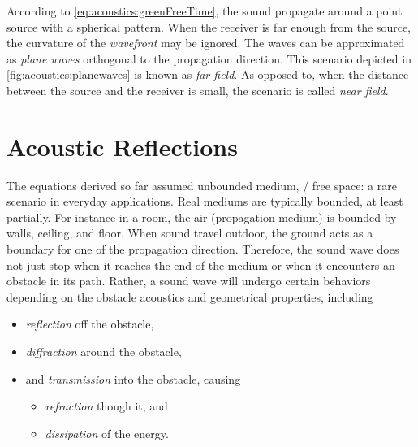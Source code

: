 According to \cref{eq:acoustics:greenFreeTime}, the sound propagate around a point source with a spherical pattern.
When the receiver is far enough from the source, the curvature of the \textit{wavefront} may be ignored.
The waves can be approximated as \textit{plane waves} orthogonal to the propagation direction.
This scenario depicted in \cref{fig:acoustics:planewaves} is known as \textit{far-field}.
As opposed to, when the distance between the source and the receiver is small, the scenario is called \textit{near field}.

\section{Acoustic Reflections}\label{ch:acoustics:sec:reflection}
The equations derived so far assumed unbounded medium, \ie/ free space: a rare scenario in everyday applications.
Real mediums are typically bounded, at least partially.
For instance in a room, the air (propagation medium) is bounded by walls, ceiling, and floor.
When sound travel outdoor, the ground acts as a boundary for one of the propagation direction.
Therefore, the sound wave does not just stop when it reaches the end of the medium or when it encounters an obstacle in its path.
Rather, a sound wave will undergo certain behaviors depending on the obstacle acoustics and geometrical properties, including
\begin{itemize}
    \item \textit{reflection} off the obstacle,
    \item \textit{diffraction} around the obstacle,
    \item and \textit{transmission} into the obstacle, causing
    \begin{itemize}
        \item \textit{refraction} though it, and
        \item \textit{dissipation} of the energy.
    \end{itemize}
\end{itemize}

